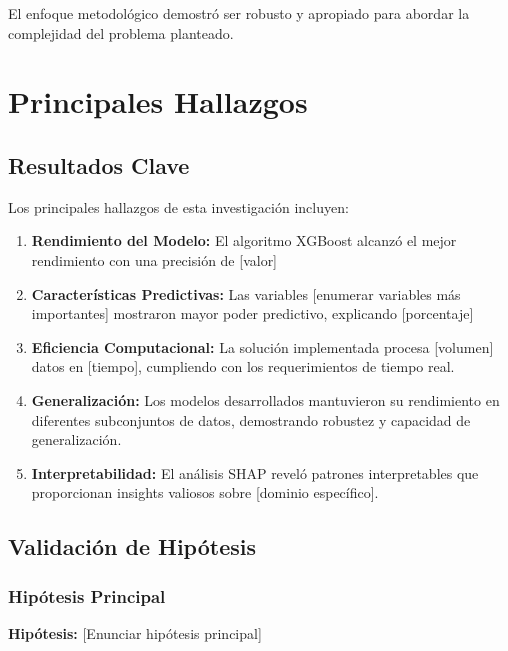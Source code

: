 El enfoque metodológico demostró ser robusto y apropiado para abordar la complejidad del problema planteado.

\section{Principales Hallazgos}

\subsection{Resultados Clave}

Los principales hallazgos de esta investigación incluyen:

\begin{enumerate}
    \item \textbf{Rendimiento del Modelo:} El algoritmo XGBoost alcanzó el mejor rendimiento con una precisión de [valor]%
    
    \item \textbf{Características Predictivas:} Las variables [enumerar variables más importantes] mostraron mayor poder predictivo, explicando [porcentaje]%
    
    \item \textbf{Eficiencia Computacional:} La solución implementada procesa [volumen] datos en [tiempo], cumpliendo con los requerimientos de tiempo real.
    
    \item \textbf{Generalización:} Los modelos desarrollados mantuvieron su rendimiento en diferentes subconjuntos de datos, demostrando robustez y capacidad de generalización.
    
    \item \textbf{Interpretabilidad:} El análisis SHAP reveló patrones interpretables que proporcionan insights valiosos sobre [dominio específico].
\end{enumerate}

\subsection{Validación de Hipótesis}

\subsubsection{Hipótesis Principal}

\textbf{Hipótesis:} [Enunciar hipótesis principal]

